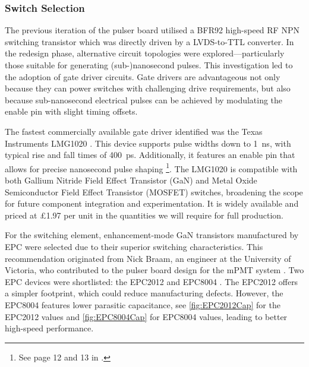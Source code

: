 \documentclass[a4paper,11pt]{article}
\begin{document}
\subsubsection{Switch Selection}

The previous iteration of the pulser board utilised a BFR92 \cite{BFR92} high-speed RF NPN switching transistor which was directly driven by a LVDS-to-TTL converter. In the redesign phase, alternative circuit topologies were explored—particularly those suitable for generating (sub-)nanosecond pulses. This investigation led to the adoption of gate driver circuits. Gate drivers are advantageous not only because they can power switches with challenging drive requirements, but also because sub-nanosecond electrical pulses can be achieved by modulating the enable pin with slight timing offsets.

The fastest commercially available gate driver identified was the Texas Instruments LMG1020 \cite{LMG1020}. This device supports pulse widths down to 1~ns, with typical rise and fall times of 400~ps. Additionally, it features an enable pin that allows for precise nanosecond pulse shaping \footnote{See page 12 and 13 in \cite{LMG1020}.}. The LMG1020 is compatible with both Gallium Nitride Field Effect Transistor (GaN) and Metal Oxide Semiconductor Field Effect Transistor (MOSFET) switches, broadening the scope for future component integration and experimentation. It is widely available and priced at £1.97 per unit in the quantities we will require for full production.

For the switching element, enhancement-mode GaN transistors manufactured by EPC were selected due to their superior switching characteristics. This recommendation originated from Nick Braam, an engineer at the University of Victoria, who contributed to the pulser board design for the mPMT system \cite{TN52}. Two EPC devices were shortlisted: the EPC2012 \cite{EPC2012} and EPC8004 \cite{EPC8004}. The EPC2012 offers a simpler footprint, which could reduce manufacturing defects. However, the EPC8004 features lower parasitic capacitance, see \cref{fig:EPC2012Cap} for the EPC2012 values and \cref{fig:EPC8004Cap} for EPC8004 values, leading to better high-speed performance.
\end{document}
